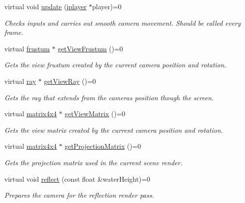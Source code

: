 \begin{DoxyCompactItemize}
virtual void \hyperlink{classflounder_1_1icamera_ac7dc04e6fed5a9269c3d6ef11807fe99}{update} (\hyperlink{classflounder_1_1iplayer}{iplayer} $\ast$player)=0
\begin{DoxyCompactList}\small\item\em Checks inputs and carries out smooth camera movement. Should be called every frame. \end{DoxyCompactList}\item 
virtual \hyperlink{classflounder_1_1frustum}{frustum} $\ast$ \hyperlink{classflounder_1_1icamera_a6727d2cb720be2830e44ece8ad8e106b}{get\+View\+Frustum} ()=0
\begin{DoxyCompactList}\small\item\em Gets the view frustum created by the current camera position and rotation. \end{DoxyCompactList}\item 
virtual \hyperlink{classflounder_1_1ray}{ray} $\ast$ \hyperlink{classflounder_1_1icamera_a9b461abd1e1fd39127d3f2bc531aa847}{get\+View\+Ray} ()=0
\begin{DoxyCompactList}\small\item\em Gets the ray that extends from the cameras position though the screen. \end{DoxyCompactList}\item 
virtual \hyperlink{classflounder_1_1matrix4x4}{matrix4x4} $\ast$ \hyperlink{classflounder_1_1icamera_a64b4b040c903d37b3963aa2774c379db}{get\+View\+Matrix} ()=0
\begin{DoxyCompactList}\small\item\em Gets the view matrix created by the current camera position and rotation. \end{DoxyCompactList}\item 
virtual \hyperlink{classflounder_1_1matrix4x4}{matrix4x4} $\ast$ \hyperlink{classflounder_1_1icamera_a551908ec508ef29f1652c830cbe554f4}{get\+Projection\+Matrix} ()=0
\begin{DoxyCompactList}\small\item\em Gets the projection matrix used in the current scene render. \end{DoxyCompactList}\item 
virtual void \hyperlink{classflounder_1_1icamera_a20ee0d37d318012ac51e132ed02af6da}{reflect} (const float \&water\+Height)=0
\begin{DoxyCompactList}\small\item\em Prepares the camera for the reflection render pass. \end{DoxyCompactList}\item 

\end{DoxyCompactItemize}

